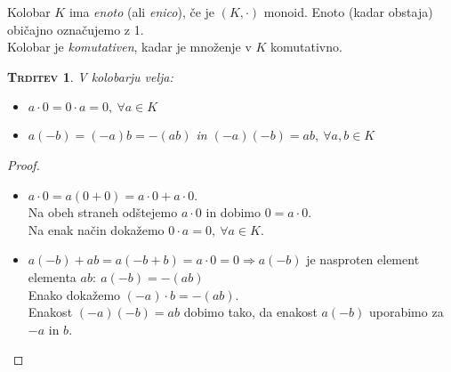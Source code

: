 \documentclass[a4paper,12pt]{article}
\newtheorem*{trditev}{\textsc{Trditev}}
\begin{document}
\noindent Kolobar $K$ ima \emph{enoto} (ali \emph{enico}), če je $(K,\cdot)$ monoid. Enoto (kadar obstaja) običajno \linebreak označujemo z 1. \\ 

\noindent Kolobar je \emph{komutativen}, kadar je množenje v $K$ komutativno.\\

\begin{trditev}
V kolobarju velja:
\begin{itemize}
\item[1)] $a\cdot 0=0\cdot a=0,~\forall a\in K$
\item[2)] $a(-b)=(-a)b=-(ab)$ in $(-a)(-b)=ab,~\forall a,b\in K$\\
\end{itemize}
\end{trditev}

\begin{proof} ~
\begin{itemize}
\item[1)] $a\cdot 0=a(0+0)=a\cdot 0 + a \cdot 0$. \\

Na obeh straneh odštejemo $a\cdot 0$ in dobimo $0=a\cdot 0$.\\

Na enak način dokažemo $0\cdot a=0,~\forall a \in K$.\\

\item[2)] $a(-b)+ab=a(-b+b)=a\cdot 0=0 \Rightarrow a(-b)$ je nasproten element elementa $ab:~a(-b)=-(ab)$ \\

Enako dokažemo $(-a)\cdot b=-(ab)$.\\

Enakost $(-a)(-b)=ab$ dobimo tako, da enakost $a(-b)$ uporabimo za $-a$ in $b$.
\end{itemize}
\end{proof}

\newpage 
\end{document}
